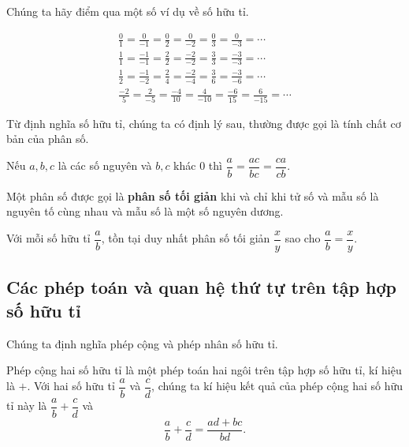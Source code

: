 Chúng ta hãy điểm qua một số ví dụ về số hữu tỉ.
\begin{example}
    \begin{align*}
        \frac{0}{1} = \frac{0}{-1} = \frac{0}{2} = \frac{0}{-2} = \frac{0}{3} = \frac{0}{-3} = \cdots        \\
        \frac{1}{1} = \frac{-1}{-1} = \frac{2}{2} = \frac{-2}{-2} = \frac{3}{3} = \frac{-3}{-3} = \cdots     \\
        \frac{1}{2} = \frac{-1}{-2} = \frac{2}{4} = \frac{-2}{-4} = \frac{3}{6} = \frac{-3}{-6} = \cdots     \\
        \frac{-2}{5} = \frac{2}{-5} = \frac{-4}{10} = \frac{4}{-10} = \frac{-6}{15} = \frac{6}{-15} = \cdots
    \end{align*}
\end{example}

Từ định nghĩa số hữu tỉ, chúng ta có định lý sau, thường được gọi là tính chất cơ bản của phân số.
\begin{theorem}\label{theorem:fundamental-property-of-fraction}
    Nếu $a, b, c$ là các số nguyên và $b, c$ khác $0$ thì $\dfrac{a}{b} = \dfrac{ac}{bc} = \dfrac{ca}{cb}$.
\end{theorem}

\begin{theorem}
    Một phân số được gọi là \textbf{phân số tối giản} khi và chỉ khi tử số và mẫu số là nguyên tố cùng nhau và mẫu số là một số nguyên dương.
    
    Với mỗi số hữu tỉ $\dfrac{a}{b}$, tồn tại duy nhất phân số tối giản $\dfrac{x}{y}$ sao cho $\dfrac{a}{b} = \dfrac{x}{y}$.
\end{theorem}

\subsection{Các phép toán và quan hệ thứ tự trên tập hợp số hữu tỉ}

Chúng ta định nghĩa phép cộng và phép nhân số hữu tỉ.
\begin{definition}
    Phép cộng hai số hữu tỉ là một phép toán hai ngôi trên tập hợp số hữu tỉ, kí hiệu là $+$. Với hai số hữu tỉ $\dfrac{a}{b}$ và $\dfrac{c}{d}$, chúng ta kí hiệu kết quả của phép cộng hai số hữu tỉ này là $\dfrac{a}{b} + \dfrac{c}{d}$ và
    \[
        \frac{a}{b} + \frac{c}{d} = \frac{a d + b c}{b d}.
    \]
\end{definition}

